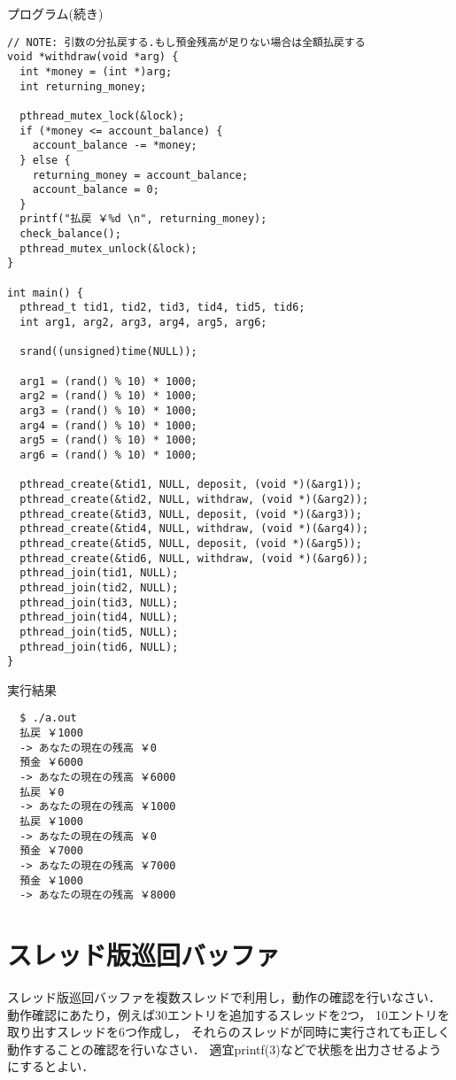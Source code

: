 \documentclass[10pt]{jarticle}
\begin{document}
\begin{itembox}[l]{プログラム(続き)}
  \begin{verbatim}
// NOTE: 引数の分払戻する.もし預金残高が足りない場合は全額払戻する
void *withdraw(void *arg) {
  int *money = (int *)arg;
  int returning_money;

  pthread_mutex_lock(&lock);
  if (*money <= account_balance) {
    account_balance -= *money;
  } else {
    returning_money = account_balance;
    account_balance = 0;
  }
  printf("払戻 ￥%d \n", returning_money);
  check_balance();
  pthread_mutex_unlock(&lock);
}

int main() {
  pthread_t tid1, tid2, tid3, tid4, tid5, tid6;
  int arg1, arg2, arg3, arg4, arg5, arg6;

  srand((unsigned)time(NULL));

  arg1 = (rand() % 10) * 1000;
  arg2 = (rand() % 10) * 1000;
  arg3 = (rand() % 10) * 1000;
  arg4 = (rand() % 10) * 1000;
  arg5 = (rand() % 10) * 1000;
  arg6 = (rand() % 10) * 1000;

  pthread_create(&tid1, NULL, deposit, (void *)(&arg1));
  pthread_create(&tid2, NULL, withdraw, (void *)(&arg2));
  pthread_create(&tid3, NULL, deposit, (void *)(&arg3));
  pthread_create(&tid4, NULL, withdraw, (void *)(&arg4));
  pthread_create(&tid5, NULL, deposit, (void *)(&arg5));
  pthread_create(&tid6, NULL, withdraw, (void *)(&arg6));
  pthread_join(tid1, NULL);
  pthread_join(tid2, NULL);
  pthread_join(tid3, NULL);
  pthread_join(tid4, NULL);
  pthread_join(tid5, NULL);
  pthread_join(tid6, NULL);
}
  \end{verbatim}
\end{itembox}

\begin{itembox}[l]{実行結果}
  \begin{verbatim}
  $ ./a.out
  払戻 ￥1000
  -> あなたの現在の残高 ￥0
  預金 ￥6000
  -> あなたの現在の残高 ￥6000
  払戻 ￥0
  -> あなたの現在の残高 ￥1000
  払戻 ￥1000
  -> あなたの現在の残高 ￥0
  預金 ￥7000
  -> あなたの現在の残高 ￥7000
  預金 ￥1000
  -> あなたの現在の残高 ￥8000
  \end{verbatim}
\end{itembox}

\newpage

\section{スレッド版巡回バッファ}
スレッド版巡回バッファを複数スレッドで利用し，動作の確認を行いなさい．
動作確認にあたり，例えば30エントリを追加するスレッドを2つ，
10エントリを取り出すスレッドを6つ作成し，
それらのスレッドが同時に実行されても正しく動作することの確認を行いなさい．
適宜printf(3)などで状態を出力させるようにするとよい．
\end{document}
